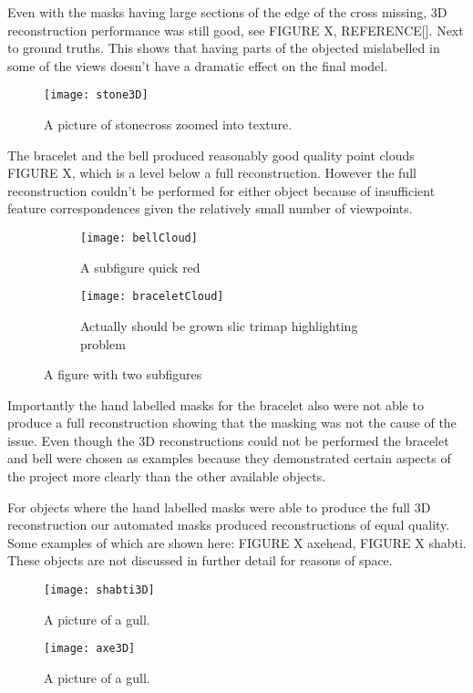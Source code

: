 \documentclass[12pt]{IIBproject}
\begin{document}
Even with the masks having large sections of the edge of the cross missing, 3D reconstruction performance was still good, see FIGURE X, REFERENCE[]. Next to ground truths. This shows that having parts of the objected mislabelled in some of the views doesn't have a dramatic effect on the final model.
\begin{figure}[H]
  \caption{A picture of stonecross zoomed into texture.}
  \centering
    \texttt{[image: stone3D]}
\end{figure}
The bracelet and the bell produced reasonably good quality point clouds FIGURE X, which is a level below a full reconstruction. However the full reconstruction couldn't be performed for either object because of insufficient feature correspondences given the relatively small number of viewpoints. 
\begin{figure}[H]
\centering
\begin{subfigure}{.5\textwidth}
  \centering
  \texttt{[image: bellCloud]}
  \caption{A subfigure quick red}
  \label{fig:sub2}
\end{subfigure}
\begin{subfigure}{.5\textwidth}
  \centering
  \texttt{[image: braceletCloud]}
  \caption{Actually should be grown slic trimap highlighting problem}
  \label{fig:sub2}
\end{subfigure}

\caption{A figure with two subfigures}
\label{fig:test}
\end{figure}

Importantly the hand labelled masks for the bracelet also were not able to produce a full reconstruction showing that the masking was not the cause of the issue. Even though the 3D reconstructions could not be performed the bracelet and bell were chosen as examples because they demonstrated certain aspects of the project more clearly than the other available objects. 

For objects where the hand labelled masks were able to produce the full 3D reconstruction our automated masks produced reconstructions of equal quality. Some examples of which are shown here: FIGURE X axehead, FIGURE X shabti. These objects are not discussed in further detail for reasons of space.
\begin{figure}[H]
  \caption{A picture of a gull.}
  \centering
    \texttt{[image: shabti3D]}
\end{figure}
\begin{figure}[H]
  \caption{A picture of a gull.}
  \centering
    \texttt{[image: axe3D]}
\end{figure}
\end{document}
